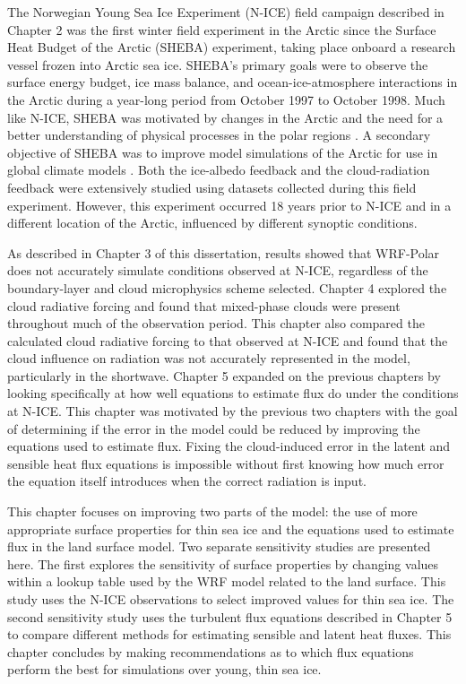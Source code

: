 The Norwegian Young Sea Ice Experiment (N-ICE) field campaign described in Chapter 2 was the first winter field experiment in the Arctic since the Surface Heat Budget of the Arctic (SHEBA) experiment, taking place onboard a research vessel frozen into Arctic sea ice. SHEBA’s primary goals were to observe the surface energy budget, ice mass balance, and ocean-ice-atmosphere interactions in the Arctic during a year-long period from October 1997 to October 1998. Much like N-ICE, SHEBA was motivated by changes in the Arctic and the need for a better understanding of physical processes in the polar regions \citep{randall:1998}. A secondary objective of SHEBA was to improve model simulations of the Arctic for use in global climate models \citep{uttal:2002}. Both the ice-albedo feedback and the cloud-radiation feedback were extensively studied using datasets collected during this field experiment. However, this experiment occurred 18 years prior to N-ICE and in a different location of the Arctic, influenced by different synoptic conditions. 

 As described in Chapter 3 of this dissertation, results showed that WRF-Polar does not accurately simulate conditions observed at N-ICE, regardless of the boundary-layer and cloud microphysics scheme selected. Chapter 4 explored the cloud radiative forcing and found that mixed-phase clouds were present throughout much of the observation period. This chapter also compared the calculated cloud radiative forcing to that observed at N-ICE and found that the cloud influence on radiation was not accurately represented in the model, particularly in the shortwave. Chapter 5 expanded on the previous chapters by looking specifically at how well equations to estimate flux do under the conditions at N-ICE. This chapter was motivated by the previous two chapters with the goal of determining if the error in the model could be reduced by improving the equations used to estimate flux. Fixing the cloud-induced error in the latent and sensible heat flux equations is impossible without first knowing how much error the equation itself introduces when the correct radiation is input.

This chapter focuses on improving two parts of the model: the use of more appropriate surface properties for thin sea ice and the equations used to estimate flux in the land surface model. Two separate sensitivity studies are presented here. The first explores the sensitivity of surface properties by changing values within a lookup table used by the WRF model related to the land surface. This study uses the N-ICE observations to select improved values for thin sea ice. The second sensitivity study uses the turbulent flux equations described in Chapter 5 to compare different methods for estimating sensible and latent heat fluxes. This chapter concludes by making recommendations as to which flux equations perform the best for simulations over young, thin sea ice.

